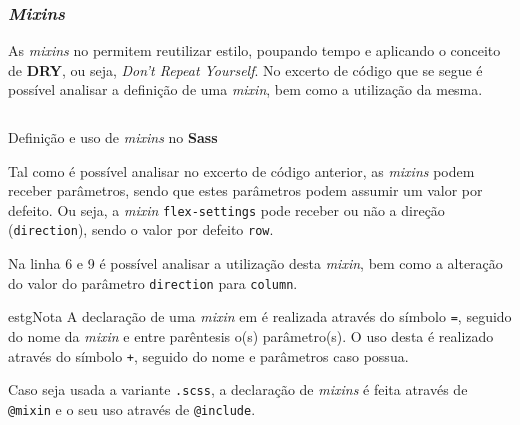 \subsubsection{\textit{Mixins}}

As \textit{mixins} no \textbf{} permitem reutilizar estilo, poupando tempo e aplicando o conceito de \textbf{DRY}, ou seja, \textit{Don't Repeat Yourself}. No excerto de código que se segue é possível analisar a definição de uma \textit{mixin}, bem como a utilização da mesma.

\begin{longlisting}
	\inputminted[highlightlines={6,9},highlightcolor=yellow!25]{sass}{code/sass/mixins.sass}
	\caption{Definição e uso de \textit{mixins} no \textbf{Sass}}
\end{longlisting}

Tal como é possível analisar no excerto de código anterior, as \textit{mixins} podem receber parâmetros, sendo que estes parâmetros podem assumir um valor por defeito. Ou seja, a \textit{mixin} \verb|flex-settings| pode receber ou não a direção (\verb|direction|), sendo o valor por defeito \texttt{row}.

Na linha 6 e 9 é possível analisar a utilização desta \textit{mixin}, bem como a alteração do valor do parâmetro \verb|direction| para \verb|column|.

\begin{mybox}{estg}{Nota}
	A declaração de uma \textit{mixin} em \textbf{} é realizada através do símbolo \verb|=|, seguido do nome da \textit{mixin} e entre parêntesis o(s) parâmetro(s). O uso desta é realizado através do símbolo \verb|+|, seguido do nome e parâmetros caso possua.

	Caso seja usada a variante \verb|.scss|, a declaração de \textit{mixins} é feita através de \verb|@mixin| e o seu uso através de \verb|@include|.
\end{mybox}